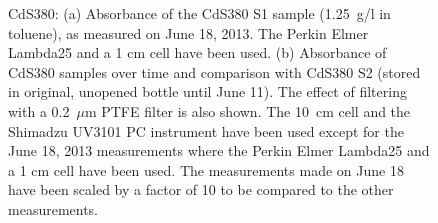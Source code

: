 \documentclass[cits]{JINST}
\begin{document}
\begin{figure}
        \begin{center}
        \caption[]{CdS380: (a) Absorbance of the CdS380 S1 sample (1.25~g/l in toluene), as measured on June 18, 2013. The Perkin Elmer Lambda25 and a 1 cm cell have been used. (b) Absorbance of CdS380 samples over time and comparison with CdS380 S2 (stored in original, unopened bottle until June 11). The effect of filtering with a 0.2~$\mu$m PTFE filter is also shown. The 10~cm cell and the Shimadzu UV3101 PC instrument have been used except for the June 18, 2013 measurements where the Perkin Elmer Lambda25 and a 1 cm cell have been used. The measurements made on June 18 have been scaled by a factor of 10 to be compared to the other measurements. \label{cds380_stability}}
        \end{center}
\end{figure}
\end{document}
